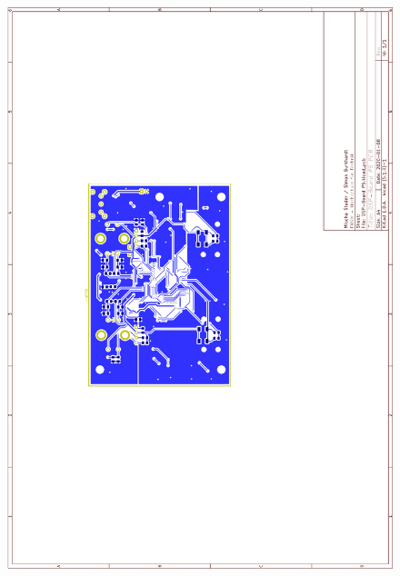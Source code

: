 \begin{appendix}
\begin{figure}[h]
	\centering
	\includegraphics[width=0.95\linewidth]{appendix/DSP-Board PCB V1-1 (2).pdf}
\end{figure}


\end{appendix}
